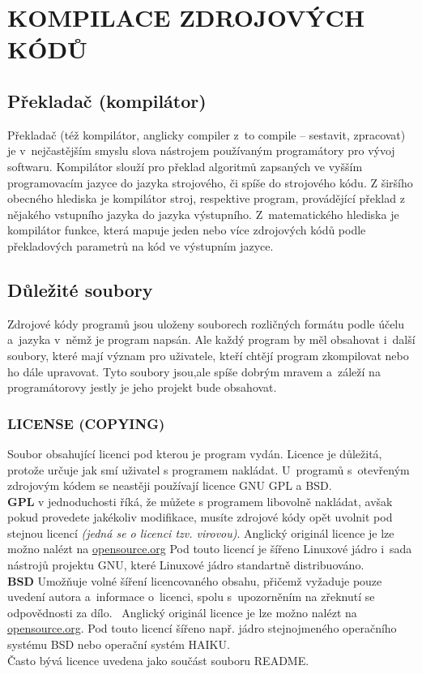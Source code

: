 \documentclass[a4paper,12pt]{article}
\newcommand{\upc}[1]{\uppercase{#1}} %
\renewcommand{\b}[1]{\textbf{#1}} %
\renewcommand{\it}[1]{\textit{#1}}		%
\begin{document}
\section{\upc{Kompilace zdrojových kódů}}
\subsection{Překladač (kompilátor)}
Překladač (též kompilátor, anglicky compiler z~to compile – sestavit, zpracovat) je v~nejčastějším smyslu slova nástrojem používaným programátory pro vývoj softwaru. Kompilátor slouží pro překlad algoritmů zapsaných ve vyšším programovacím jazyce do jazyka strojového, či spíše do strojového kódu. Z širšího obecného hlediska je kompilátor stroj, respektive program, provádějící překlad z nějakého vstupního jazyka do jazyka výstupního. Z~matematického hlediska je kompilátor funkce, která mapuje jeden nebo více zdrojových kódů podle překladových parametrů na kód ve výstupním jazyce.~\cite{Wkom}
\subsection{Důležité soubory}
Zdrojové kódy programů jsou uloženy souborech rozličných formátu podle účelu a~jazyka v~němž je program napsán. Ale každý program by měl obsahovat i~další soubory, které mají význam pro uživatele, kteří chtějí program zkompilovat nebo ho dále upravovat. Tyto soubory jsou,ale spíše dobrým mravem a~záleží na programátorovy jestly je jeho projekt bude obsahovat.
\subsubsection{LICENSE (COPYING)}
Soubor obsahující licenci pod kterou je program vydán. Licence je důležitá, protože určuje jak smí uživatel s programem nakládat. U~programů s~otevřeným zdrojovým kódem se neastěji používají licence GNU GPL a BSD.\\ \b{GPL} v jednoduchosti říká, že můžete s programem libovolně nakládat, avšak pokud provedete jakékoliv modifikace, musíte zdrojové kódy opět uvolnit pod stejnou licencí \it{(jedná se o licenci tzv. virovou)}. Anglický originál licence je lze možno nalézt na \href{http://www.opensource.org/licenses/gpl-3.0}{opensource.org} Pod touto licencí je šířeno Linuxové jádro i~sada nástrojů projektu GNU, které Linuxové jádro standartně distribuováno.\\ \b{BSD} Umožňuje volné šíření licencovaného obsahu, přičemž vyžaduje pouze uvedení autora a~informace o~licenci, spolu s~upozorněním na zřeknutí se odpovědnosti za dílo.~\cite{BSDL} Anglický originál licence je lze možno nalézt na \href{http://www.opensource.org/licenses/bsd-license.php}{opensource.org}. Pod touto licencí šířeno např. jádro stejnojmeného operačního systému BSD nebo operační systém HAIKU.\\
Často bývá licence uvedena jako součást souboru README.
\end{document}
